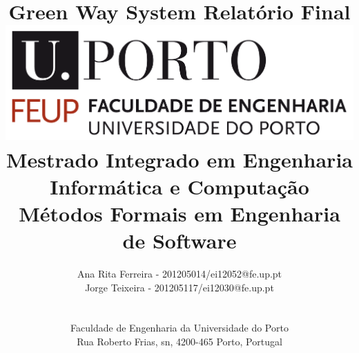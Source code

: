 \documentclass[a4paper]{article}
\begin{document}
\title{\Huge\textbf{Green Way System 
}\linebreak\linebreak\linebreak
\Large\textbf{Relatório Final}\linebreak\linebreak
\linebreak\linebreak
\includegraphics[scale=0.1]{feup-logo.png}\linebreak\linebreak
\linebreak\linebreak\linebreak
\linebreak
\Large{Mestrado Integrado em Engenharia Informática e Computação} \linebreak\linebreak
\Large{Métodos Formais em Engenharia de Software}\linebreak\linebreak
\linebreak
}

\author{Ana Rita Ferreira - 201205014/ei12052@fe.up.pt \\ Jorge Teixeira - 201205117/ei12030@fe.up.pt \\\linebreak\linebreak \\
 \\ Faculdade de Engenharia da Universidade do Porto \\ Rua Roberto Frias, s\/n, 4200-465 Porto, Portugal \linebreak\linebreak\linebreak
\linebreak\linebreak\vspace{1cm}}


\maketitle
\thispagestyle{empty}
\end{document}
